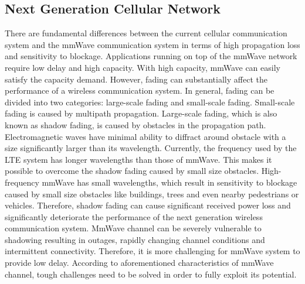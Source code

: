 \subsection{Next Generation Cellular Network}
\label{subsec:1}
\par There are fundamental differences between the current cellular communication system and the mmWave communication system in terms of high propagation loss and sensitivity to blockage. Applications running on top of the mmWave network require low delay and high capacity. With high capacity, mmWave can easily satisfy the capacity demand. However, fading can substantially affect the performance of a wireless communication system. In general, fading can be divided into two categories: large-scale fading and small-scale fading. Small-scale fading is caused by multipath propagation. Large-scale fading, which is also known as shadow fading, is caused by obstacles in the propagation path. Electromagnetic waves have minimal ability to diffract around obstacle with a size significantly larger than its wavelength. Currently, the frequency used by the LTE system has longer wavelengths than those of mmWave. This makes it possible to overcome the shadow fading caused by small size obstacles. High-frequency mmWave has small wavelengths, which result in sensitivity to blockage caused by small size obstacles like buildings, trees and even nearby pedestrians or vehicles. Therefore, shadow fading  can cause significant received power loss and significantly deteriorate the performance of the next generation wireless communication system. MmWave channel can be severely vulnerable to shadowing resulting in outages, rapidly changing channel conditions and intermittent connectivity. Therefore, it is more challenging for mmWave system to provide low delay. According to aforementioned characteristics of mmWave channel, tough challenges need to be solved in order to fully exploit its potential. 


